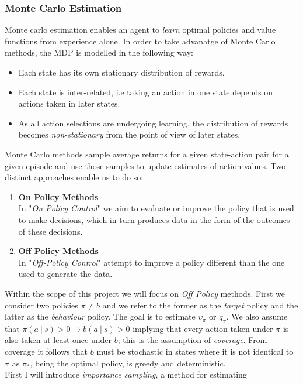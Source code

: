 \subsubsection{Monte Carlo Estimation}
Monte carlo estimation enables an agent to \emph{learn} optimal policies and value functions
from experience alone. In order to take advanatge of Monte Carlo methods, the MDP
is modelled in the following way:
\begin{itemize}
    \item Each state has its own stationary distribution of rewards.
    \item Each state is inter-related, i.e taking an action in one state depends on actions taken in later states.
    \item As all action selections are undergoing learning, the distribution of rewards becomes \emph{non-stationary}
    from the point of view of later states. 
\end{itemize}
Monte Carlo methods sample average returns for a given state-action pair for a given
episode and use those samples to update estimates of action values.
Two distinct approaches enable us to do so:
\begin{enumerate}
    \item \textbf{On Policy Methods} \\
        In "\emph{On Policy Control}" we aim to evaluate or improve
        the policy that is used to make decisions, which in turn produces data in the
        form of the outcomes of these decisions.
    \item \textbf{Off Policy Methods} \\
        In "\emph{Off-Policy Control}" attempt to improve a policy different than the
        one used to generate the data.
\end{enumerate}
Within the scope of this project we will focus on \emph{Off Policy} methods.
First we consider two policies $\pi \neq b$ and we refer to the former as the \emph{target}
policy and the latter as the \emph{behaviour} policy. The goal is to estimate $\upsilon_\pi$
or $q_\pi$. We also assume that $\pi(a\:|\:s) > 0 \rightarrow b(a \:|\:s) >0$ implying that 
every action taken under $\pi$ is also taken at least once under $b$; this is the assumption of \emph{coverage}.
From coverage it follows that $b$ must be stochastic in states where it is not identical to
$\pi$ as $\pi_*$, being the optimal policy, is greedy and deterministic.\\
First I will introduce \emph{importance sampling}, a method for estimating

